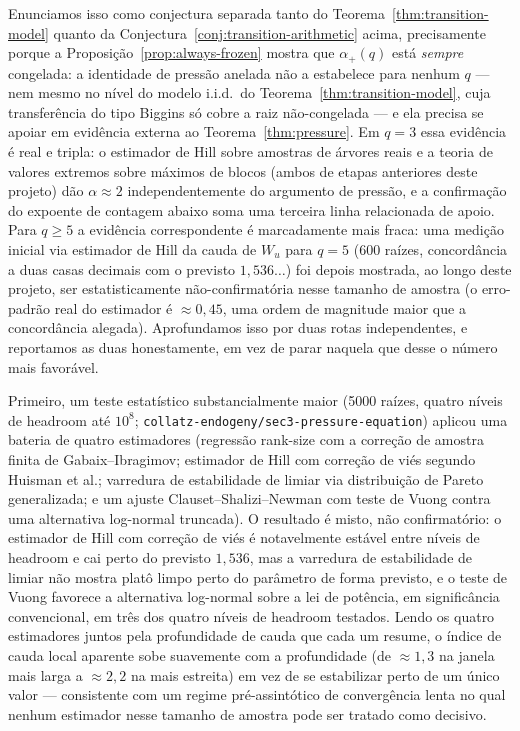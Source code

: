 \documentclass[11pt]{article}
\theoremstyle{definition}
\theoremstyle{remark}
\begin{document}
Enunciamos isso como conjectura separada tanto do
Teorema~\ref{thm:transition-model} quanto da
Conjectura~\ref{conj:transition-arithmetic} acima, precisamente porque a
Proposição~\ref{prop:always-frozen} mostra que $\alpha_+(q)$ está
\emph{sempre} congelada: a identidade de pressão anelada não a
estabelece para nenhum $q$ --- nem mesmo no nível do modelo i.i.d.\ do
Teorema~\ref{thm:transition-model}, cuja transferência do tipo Biggins
só cobre a raiz não-congelada --- e ela precisa se apoiar em evidência
externa ao Teorema~\ref{thm:pressure}. Em $q=3$ essa evidência é real e
tripla: o estimador de Hill sobre amostras de árvores reais e a teoria
de valores extremos sobre máximos de blocos (ambos de etapas anteriores
deste projeto) dão $\alpha\approx2$ independentemente do argumento de
pressão, e a confirmação do expoente de contagem abaixo soma uma
terceira linha relacionada de apoio. Para $q\ge5$ a evidência
correspondente é marcadamente mais fraca: uma medição inicial via
estimador de Hill da cauda de $W_u$ para $q=5$ (600 raízes,
concordância a duas casas decimais com o previsto $1{,}536\ldots$) foi
depois mostrada, ao longo deste projeto, ser estatisticamente
não-confirmatória nesse tamanho de amostra (o erro-padrão real do
estimador é $\approx0{,}45$, uma ordem de magnitude maior que a
concordância alegada). Aprofundamos isso por duas rotas independentes,
e reportamos as duas honestamente, em vez de parar naquela que desse o
número mais favorável.

Primeiro, um teste estatístico substancialmente maior (5000 raízes,
quatro níveis de headroom até $10^8$;
\texttt{collatz-endogeny/\allowbreak sec3-pressure-equation}) aplicou uma bateria
de quatro estimadores (regressão rank-size com a correção de amostra
finita de Gabaix--Ibragimov; estimador de Hill com correção de viés
segundo Huisman et al.; varredura de estabilidade de limiar via
distribuição de Pareto generalizada; e um ajuste
Clauset--Shalizi--Newman com teste de Vuong contra uma alternativa
log-normal truncada). O resultado é misto, não confirmatório: o
estimador de Hill com correção de viés é notavelmente estável entre
níveis de headroom e cai perto do previsto $1{,}536$, mas a varredura
de estabilidade de limiar não mostra platô limpo perto do parâmetro de
forma previsto, e o teste de Vuong favorece a alternativa log-normal
sobre a lei de potência, em significância convencional, em três dos
quatro níveis de headroom testados. Lendo os quatro estimadores juntos
pela profundidade de cauda que cada um resume, o índice de cauda local
aparente sobe suavemente com a profundidade (de $\approx1{,}3$ na
janela mais larga a $\approx2{,}2$ na mais estreita) em vez de se
estabilizar perto de um único valor --- consistente com um regime
pré-assintótico de convergência lenta no qual nenhum estimador nesse
tamanho de amostra pode ser tratado como decisivo.
\end{document}
